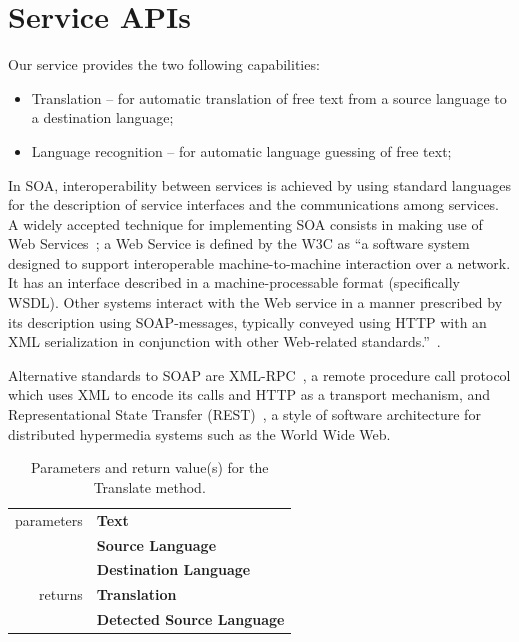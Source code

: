 \documentclass[11pt]{article}
\begin{document}
\section{Service APIs}

Our service provides the two following capabilities:

\begin{itemize}
  \item Translation -- for automatic translation of free text from a source language to a destination language;
  \item Language recognition -- for automatic language guessing of free text;
\end{itemize}

In SOA, interoperability between services is achieved by using standard languages for the 
description of service interfaces and the communications among services. A widely accepted 
technique for implementing SOA consists in making use of Web Services~\citep{soa}; a Web 
Service is defined by the W3C as ``a software system designed to support interoperable 
machine-to-machine interaction over a network. It has an interface described in a 
machine-processable format (specifically WSDL). Other systems interact with the Web service 
in a manner prescribed by its description using SOAP-messages, typically conveyed using 
HTTP with an XML serialization in conjunction with other Web-related standards.''~\citep{wsgloss}. 

Alternative standards to SOAP are XML-RPC~\citep{xmlrpcspec}, a remote procedure call 
protocol which uses XML to encode its calls and HTTP as a transport mechanism, and 
Representational State Transfer (REST)~\citep{rest}, a style of software architecture 
for distributed hypermedia systems such as the World Wide Web.

\begin{table}[!ht]
\begin{center}
 \begin{tabular}{|r|l|}
  \hline
   parameters	& {\bf Text} \\ \cline{2-2}
   				& {\bf Source Language} \\ \cline{2-2}
   				& {\bf Destination Language} \\ %
  \hline \hline
   returns 	& {\bf Translation} \\ \cline{2-2}
   			& {\bf Detected Source Language} \\
  \hline
 \end{tabular}
\end{center}
\caption{Parameters and return value(s) for the Translate method.}
\label{tab:translate}
\end{table}
\end{document}
